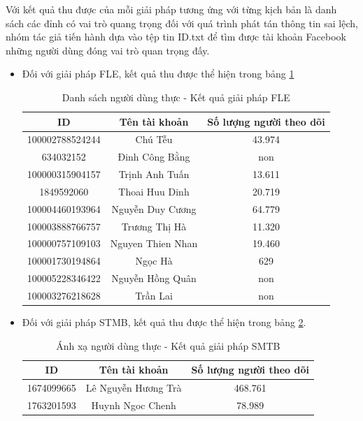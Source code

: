 Với kết quả thu được của mỗi giải pháp tương ứng với từng kịch bản là danh sách các đỉnh có vai trò quang trọng đối với quá trình phát tán thông tin sai lệch, nhóm tác giả tiến hành dựa vào tệp tin ID.txt để tìm được tài khoản Facebook những người dùng đóng vai trò quan trọng đấy.

\begin{itemize}
	\item Đối với giải pháp FLE, kết quả thu được thể hiện trong bảng \ref{anhxafle}
	\begin{table} [H]
		\centering
		\begin{tabular}{|c|c|c|}
			\hline
			ID & Tên tài khoản & Số lượng người theo dõi\\
			\hline
			100002788524244 & Chú Tễu & 43.974\\
			\hline
			634032152 & Đinh Công Bằng & non\\
			\hline
			100000315904157 & Trịnh Anh Tuấn & 13.611\\
			\hline
			1849592060 & Thoai Huu Dinh & 20.719\\
			\hline
			100004460193964 & Nguyễn Duy Cương & 64.779\\
			\hline
			100003888766757 & Trương Thị Hà & 11.320\\
			\hline 
			100000757109103 & Nguyen Thien Nhan & 19.460\\
			\hline 
			100001730194864 & Ngọc Hà & 629\\
			\hline
			100005228346422 & Nguyễn Hồng Quân & non\\
			\hline
			100003276218628 & Trần Lai & non\\
			\hline
		\end{tabular}
		\caption{Danh sách người dùng thực - Kết quả giải pháp FLE}
		\label{anhxafle} 
	\end{table}
	
	\item Đối với giải pháp STMB, kết quả thu được thể hiện trong bảng \ref{anhxastmb}.
	
	\begin{table} [H]
		\centering
		\begin{tabular}{|c|c|c|}
			\hline
			ID & Tên tài khoản & Số lượng người theo dõi\\
			\hline
			1674099665 & Lê Nguyễn Hương Trà & 468.761\\
			\hline
			1763201593 & Huynh Ngoc Chenh & 78.989\\
			\hline
		\end{tabular}
		\caption{Ánh xạ người dùng thực - Kết quả giải pháp SMTB}
		\label{anhxastmb} 
	\end{table}
	
\end{itemize}

